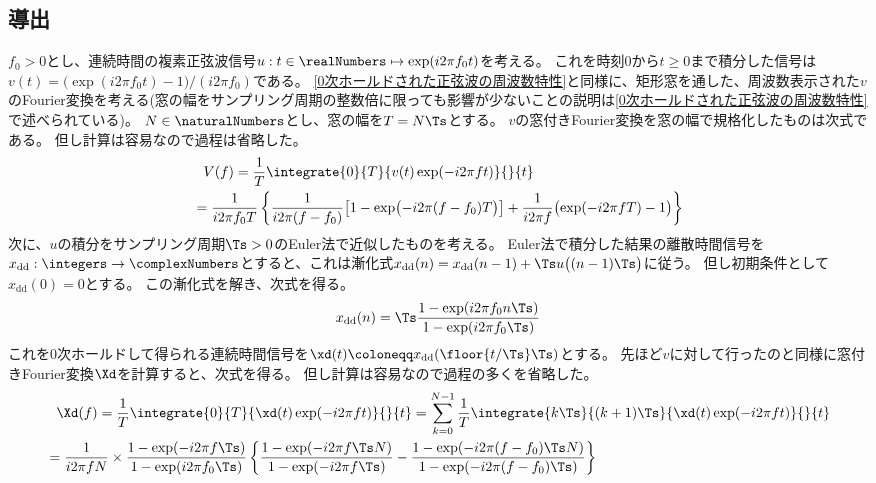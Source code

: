         \subsection{導出}
            \newcommand{\xdd}{x_\text{dd}}
            $f_0>0$とし、連続時間の複素正弦波信号$u:t\in\realNumbers\mapsto\exp(i 2\pi f_0 t)$を考える。
            これを時刻$0$から$t\geq 0$まで積分した信号は$v(t) = \bigl(\exp(i 2\pi f_0 t)-1\bigr) / (i 2\pi f_0)$である。
            \ref{0次ホールドされた正弦波の周波数特性}と同様に、矩形窓を通した、周波数表示された$v$のFourier変換を考える(窓の幅をサンプリング周期の整数倍に限っても影響が少ないことの説明は\ref{0次ホールドされた正弦波の周波数特性}で述べられている)。
            $N\in\naturalNumbers$とし、窓の幅を$T=N\Ts$とする。
            $v$の窓付きFourier変換を窓の幅で規格化したものは次式である。
            但し計算は容易なので過程は省略した。
            \begin{align*}
                &\phantom{=} V(f) = \frac{1}{T} \integrate{0}{T}{v(t)\exp(-i 2\pi f t)}{}{t} \\
                &= \frac{1}{i 2\pi f_0 T} \left\{\frac{1}{i 2\pi (f-f_0)}\bigl[1 - \exp\bigl(-i 2\pi (f-f_0)T\bigr)\bigr] + \frac{1}{i 2\pi f}\bigl(\exp(-i 2\pi f T) - 1\bigr)\right\}
            \end{align*}
            次に、$u$の積分をサンプリング周期$\Ts>0$のEuler法で近似したものを考える。
            Euler法で積分した結果の離散時間信号を$\xdd:\integers\to\complexNumbers$とすると、これは漸化式$\xdd(n) = \xdd(n-1) + \Ts u\bigl((n-1)\Ts\bigr)$に従う。
            但し初期条件として$\xdd(0)=0$とする。
            この漸化式を解き、次式を得る。
            \[ \xdd(n) = \Ts\frac{1-\exp(i 2\pi f_0 n\Ts)}{1-\exp(i 2\pi f_0\Ts)} \]
            これを0次ホールドして得られる連続時間信号を$\xd(t) \coloneqq \xdd(\floor{t/\Ts}\Ts)$とする。
            先ほど$v$に対して行ったのと同様に窓付きFourier変換$\Xd$を計算すると、次式を得る。
            但し計算は容易なので過程の多くを省略した。
            \begin{align*}
                &\phantom{=} \Xd(f) = \frac{1}{T} \integrate{0}{T}{\xd(t)\exp(-i 2\pi f t)}{}{t} = \sum_{k=0}^{N-1} \frac{1}{T} \integrate{k\Ts}{(k+1)\Ts}{\xd(t)\exp(-i 2\pi f t)}{}{t} \\
                &= \frac{1}{i 2\pi f N}\times\frac{1-\exp(-i 2\pi f\Ts)}{1-\exp(i 2\pi f_0\Ts)} \left\{\frac{1-\exp(-i 2\pi f \Ts N)}{1-\exp(-i 2\pi f \Ts)} - \frac{1-\exp(-i 2\pi (f-f_0) \Ts N)}{1-\exp(-i 2\pi (f-f_0) \Ts)}\right\}
            \end{align*}
